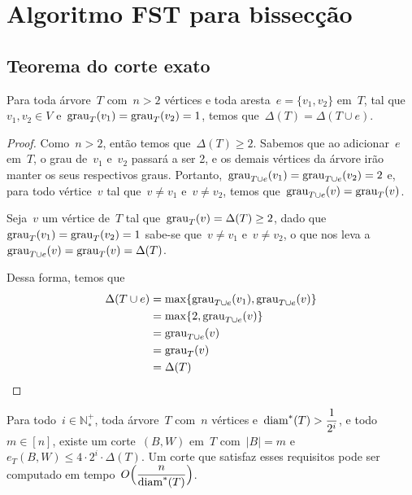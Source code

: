 \section {Algoritmo FST para bissecção}

	\subsection{Teorema do corte exato}
	\begin{lem}
	\label{lem:grauMaximo}
		Para toda árvore~$T$ com~${n>2}$ vértices
		e toda aresta~${e=\{v_1,v_2\}}$ em~$T$, 
		tal que~${v_1,v_2\in V}$ e~${\mathrm{grau}_T(v_1)=\mathrm{grau}_T(v_2)=1}$,
		temos que~${\Delta(T) = \Delta(T\cup e)}$.
	\end{lem}
	
	
	\begin{proof}
		Como~${n>2}$, então temos que~${\Delta(T)\ge 2}$.
		Sabemos que ao adicionar~$e$ em~$T$, o grau de~$v_1$
		e~$v_2$ passará a ser 2, e os demais vértices da árvore
		irão manter os seus respectivos graus.
		Portanto,~${\mathrm{grau}_{T\cup e}(v_1)=\mathrm{grau}_{T\cup e}(v_2)=2}$
		e, para todo vértice~$v$ tal que~$v\ne v_1$ e~$v\ne v_2$,
		temos que~${\mathrm{grau}_{T\cup e}(v)=\mathrm{grau}_T(v)}$.
		
		Seja~$v$ um vértice de~$T$ tal 
		que~${\mathrm{grau}_T(v) = \Delta(T)\ge 2}$,
		dado que~${\mathrm{grau}_T(v_1)=\mathrm{grau}_T(v_2)=1}$
		sabe-se que~${v\ne v_1}$ e~${v\ne v_2}$, o que nos leva 
		a~${\mathrm{grau}_{T\cup e}(v)=\mathrm{grau}_T(v)=\Delta(T)}$.

		
		Dessa forma, temos que
		\begin{align}
			\Delta(T\cup e) &= \max\{\mathrm{grau}_{T\cup e}(v_1), 
			\mathrm{grau}_{T\cup e}(v)\}\nonumber\\
         		&= \max\{2, \mathrm{grau}_{T\cup e}(v)\} \nonumber\\
				&= \mathrm{grau}_{T\cup e}(v) \nonumber\\
         		&= \mathrm{grau}_T(v) \nonumber\\
         		&= \Delta(T) \nonumber
		\end{align}		

	\end{proof}

	\bigskip
	\bigskip
	\bigskip

	\begin{teo}
	\label{teo:corteExato}
		Para todo~${i\in \mathbb{N^+_*}}$, toda árvore~$T$ com~$n$
		vértices e~${\mathrm{diam}^*(T)>\dfrac{1}{2^i}}$, e todo~${m\in[n]}$,
		existe um corte~$(B,W)$ em~$T$ com~$|B|=m$ 
		e~$e_T(B,W)\le 4\cdot 2^i\cdot \Delta(T)$.
		Um corte que satisfaz esses requisitos pode ser computado
		em tempo~${O\Big(\dfrac{n}{\mathrm{diam}^*(T)}\Big)}$.
	\end{teo}

